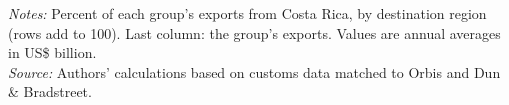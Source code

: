 \documentclass[11pt,a4paper]{article}
\begin{document}
\begin{table}[H]\centering\small%
  \caption{Costa Rica, Other Goods: Multinational Exports by Parent Region and Destination Region}%
  \label{tab:c_reg_CRI_rest}%
  \par\vspace{3pt}%
  \begin{minipage}{0.95\textwidth}\footnotesize %
  \textit{Notes:} Percent of each group's exports from Costa Rica, by destination region (rows add to 100). Last column: the group's exports. Values are annual averages in US\$ billion.\\[3pt]%
  \textit{Source:} Authors' calculations based on customs data matched to Orbis and Dun \& Bradstreet.%
  \end{minipage}%
  \end{table}
\end{document}
